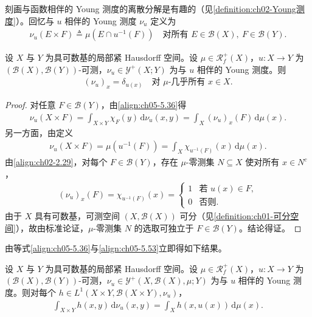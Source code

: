 \documentclass[../../main.tex]{subfiles}%
\begin{document}
刻画与函数相伴的 Young 测度的离散分解是有趣的（见\cref{definition:ch02-Young测度}）。回忆与 $u$ 相伴的 Young 测度 $\nu_u$ 定义为
\begin{align*}
\nu_u(E\times F)\triangleq \mu(E\cap u^{-1}(F))
\quad\text{对所有 }E\in\mathscr{B}(X),\ F\in\mathscr{B}(Y).
\end{align*}

\begin{proposition}\label{proposition:ch05-Dirac测度}
设 $X$ 与 $Y$ 为具可数基的局部紧 Hausdorff 空间。设 $\mu\in\mathscr{R}^+_f(X)$，$u:X\to Y$ 为 $(\mathscr{B}(X),\mathscr{B}(Y))$-可测，$\nu_u\in\mathcal{Y}^+(X;Y)$ 为与 $u$ 相伴的 Young 测度。则
\begin{align}
(\nu_u)_x=\delta_{u(x)}
\quad\text{对 }\mu\text{-几乎所有 }x\in X.\label{align:ch05-5.53}
\end{align}
\end{proposition}

\begin{proof}
对任意 $F\in\mathscr{B}(Y)$，由\eqref{align:ch05-5.36}得
\begin{align*}
\nu_u(X\times F)=\int_{X\times Y}\chi_F(y)\,\mathrm{d}\nu_u(x,y)
=\int_X(\nu_u)_x(F)\,\mathrm{d}\mu(x).
\end{align*}
另一方面，由定义
\begin{align*}
\nu_u(X\times F)=\mu(u^{-1}(F))
=\int_X\chi_{u^{-1}(F)}(x)\,\mathrm{d}\mu(x).
\end{align*}
由\eqref{align:ch02-2.29}，对每个 $F\in\mathscr{B}(Y)$，存在 $\mu$-零测集 $N\subseteq X$ 使对所有 $x\in N^c$，
\begin{align*}
(\nu_u)_x(F)=\chi_{u^{-1}(F)}(x)=
\begin{cases}
1 & \text{若 }u(x)\in F,\\
0 & \text{否则}.
\end{cases}
\end{align*}
由于 $X$ 具有可数基，可测空间 $(X,\mathscr{B}(X))$ 可分（见\cref{definition:ch01-可分空间}），故由标准论证，$\mu$-零测集 $N$ 的选取可独立于 $F\in\mathscr{B}(Y)$。结论得证。
\end{proof}

由等式\eqref{align:ch05-5.36}与\eqref{align:ch05-5.53}立即得如下结果。

\begin{corollary}\label{corollary:ch05-Young积分}
设 $X$ 与 $Y$ 为具可数基的局部紧 Hausdorff 空间。设 $\mu\in\mathscr{R}^+_f(X)$，$u:X\to Y$ 为 $(\mathscr{B}(X),\mathscr{B}(Y))$-可测，$\nu_u\in\mathcal{Y}^+(X,\mathscr{B}(X),\mu;Y)$ 为与 $u$ 相伴的 Young 测度。则对每个 $h\in L^1(X\times Y,\mathscr{B}(X\times Y),\nu_u)$，
\begin{align}
\int_{X\times Y}h(x,y)\,\mathrm{d}\nu_u(x,y)
=\int_X h(x,u(x))\,\mathrm{d}\mu(x).\label{align:ch05-5.54}
\end{align}
\end{corollary}
\end{document}
